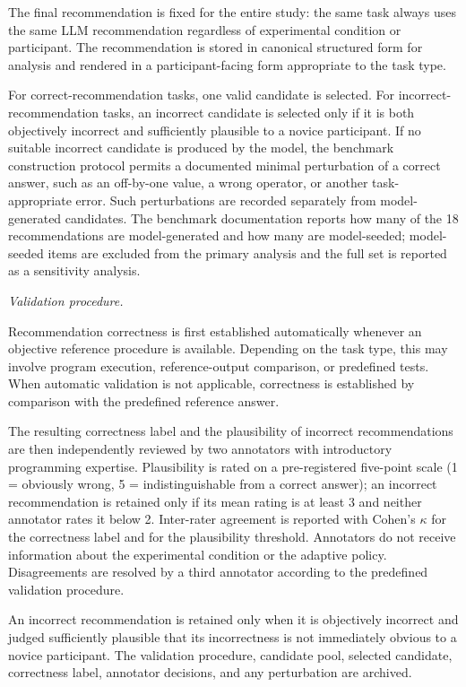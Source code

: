 \documentclass[oneside,final,14pt,a4paper]{extreport}
\begin{document}
The final recommendation is fixed for the entire study: the same task always 
uses the same LLM recommendation regardless of experimental condition or 
participant. The recommendation is stored in canonical structured form for 
analysis and rendered in a participant-facing form appropriate to the task type.

For correct-recommendation tasks, one valid candidate is selected. For
incorrect-recommendation tasks, an incorrect candidate is selected only if it
is both objectively incorrect and sufficiently plausible to a novice
participant. If no suitable incorrect candidate is produced by the model, the
benchmark construction protocol permits a documented minimal perturbation of
a correct answer, such as an off-by-one value, a wrong operator, or another
task-appropriate error. Such perturbations are recorded separately from
model-generated candidates. The benchmark documentation reports how many of
the 18 recommendations are model-generated and how many are model-seeded;
model-seeded items are excluded from the primary analysis and the full set is
reported as a sensitivity analysis.

\emph{Validation procedure.}

Recommendation correctness is first established automatically whenever an 
objective reference procedure is available. Depending on the task type, this 
may involve program execution, reference-output comparison, or predefined tests. 
When automatic validation is not applicable, correctness is established by comparison 
with the predefined reference answer.

The resulting correctness label and the plausibility of incorrect 
recommendations are then independently reviewed by two annotators with 
introductory programming expertise. Plausibility is rated on a pre-registered
five-point scale (1 = obviously wrong, 5 = indistinguishable from a correct
answer); an incorrect recommendation is retained only if its mean rating is at
least 3 and neither annotator rates it below 2. Inter-rater agreement is
reported with Cohen's $\kappa$ for the correctness label and for the
plausibility threshold. Annotators do not receive information
about the experimental condition or the adaptive policy. Disagreements are
resolved by a third annotator according to the predefined validation procedure.

An incorrect recommendation is retained only when it is objectively incorrect 
and judged sufficiently plausible that its incorrectness is not immediately 
obvious to a novice participant. The validation procedure, candidate pool, 
selected candidate, correctness label, annotator decisions, and any 
perturbation are archived.
\end{document}
